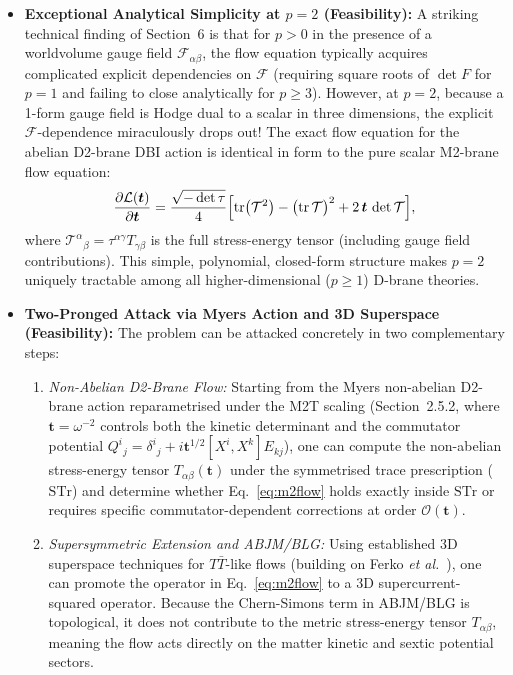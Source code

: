 \documentclass[11pt,a4paper]{article}
\begin{document}
\begin{itemize}
    \item \textbf{Exceptional Analytical Simplicity at $p=2$ (Feasibility):} A striking technical finding of Section~6 is that for $p > 0$ in the presence of a worldvolume gauge field $\mathcal{F}_{\alpha\beta}$, the flow equation typically acquires complicated explicit dependencies on $\mathcal{F}$ (requiring square roots of $\det F$ for $p=1$ and failing to close analytically for $p \ge 3$). However, at $p=2$, because a 1-form gauge field is Hodge dual to a scalar in three dimensions, the explicit $\mathcal{F}$-dependence miraculously drops out! The exact flow equation for the abelian D2-brane DBI action is identical in form to the pure scalar M2-brane flow equation:
    \begin{equation}
        \frac{\partial \mathcal{L}(\boldsymbol{t})}{\partial \boldsymbol{t}} = \frac{\sqrt{-\det \tau}}{4} \Bigl[ \operatorname{tr}\bigl(\mathcal{T}^2\bigr) - \bigl(\operatorname{tr}\mathcal{T}\bigr)^2 + 2\,\boldsymbol{t}\,\det \mathcal{T} \Bigr], \label{eq:m2flow}
    \end{equation}
    where $\mathcal{T}^\alpha{}_\beta = \tau^{\alpha\gamma} T_{\gamma\beta}$ is the full stress-energy tensor (including gauge field contributions). This simple, polynomial, closed-form structure makes $p=2$ uniquely tractable among all higher-dimensional ($p \ge 1$) D-brane theories.
    
    \item \textbf{Two-Pronged Attack via Myers Action and 3D Superspace (Feasibility):} The problem can be attacked concretely in two complementary steps:
    \begin{enumerate}
        \item \emph{Non-Abelian D2-Brane Flow:} Starting from the Myers non-abelian D2-brane action reparametrised under the M2T scaling (Section~2.5.2, where $\boldsymbol{t} = \omega^{-2}$ controls both the kinetic determinant and the commutator potential $Q^i{}_j = \delta^i{}_j + i \boldsymbol{t}^{1/2} [X^i, X^k] E_{kj}$), one can compute the non-abelian stress-energy tensor $T_{\alpha\beta}(\boldsymbol{t})$ under the symmetrised trace prescription ($\text{STr}$) and determine whether Eq.~\eqref{eq:m2flow} holds exactly inside $\text{STr}$ or requires specific commutator-dependent corrections at order $\mathcal{O}(\boldsymbol{t})$.
        \item \emph{Supersymmetric Extension and ABJM/BLG:} Using established 3D superspace techniques for $T\bar{T}$-like flows (building on Ferko \emph{et al.}~\cite{Ferko:2023sps}), one can promote the operator in Eq.~\eqref{eq:m2flow} to a 3D supercurrent-squared operator. Because the Chern-Simons term in ABJM/BLG is topological, it does not contribute to the metric stress-energy tensor $T_{\alpha\beta}$, meaning the flow acts directly on the matter kinetic and sextic potential sectors.
    \end{enumerate}
    

\end{itemize}
\end{document}
